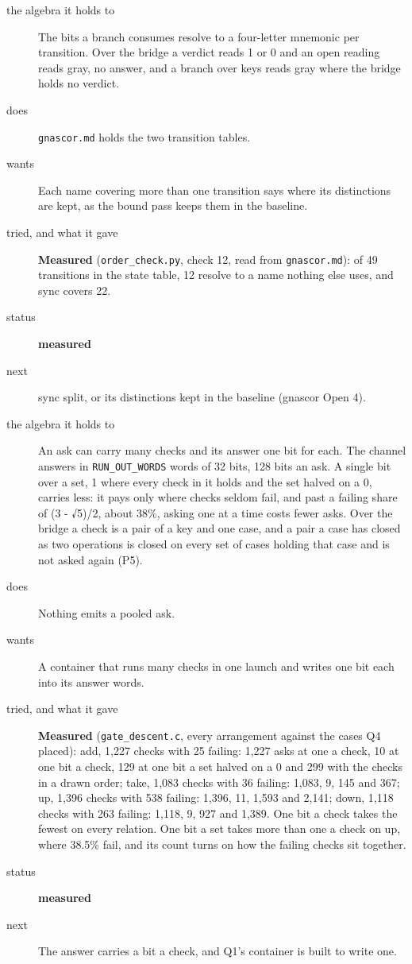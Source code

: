 \begin{description}
\item[{the algebra it holds to}] The bits a branch consumes resolve to a four-letter mnemonic per transition. Over the bridge a verdict reads 1 or 0 and an open reading reads gray, no answer, and a branch over keys reads gray where the bridge holds no verdict.
\item[{does}] \texttt{gnascor.\allowbreak{}md} holds the two transition tables.
\item[{wants}] Each name covering more than one transition says where its distinctions are kept, as the bound pass keeps them in the baseline.
\item[{tried, and what it gave}] \textbf{Measured} (\texttt{order\_\allowbreak{}check.\allowbreak{}py}, check 12, read from \texttt{gnascor.\allowbreak{}md}): of 49 transitions in the state table, 12 resolve to a name nothing else uses, and sync covers 22.
\item[{status}] \textbf{measured}
\item[{next}] sync split, or its distinctions kept in the baseline (gnascor Open 4).
\end{description}

\begin{description}
\item[{the algebra it holds to}] An ask can carry many checks and its answer one bit for each. The channel answers in \texttt{RUN\_\allowbreak{}OUT\_\allowbreak{}WORDS} words of 32 bits, 128 bits an ask. A single bit over a set, 1 where every check in it holds and the set halved on a 0, carries less: it pays only where checks seldom fail, and past a failing share of (3 - √5)/2, about 38\%, asking one at a time costs fewer asks. Over the bridge a check is a pair of a key and one case, and a pair a case has closed as two operations is closed on every set of cases holding that case and is not asked again (P5).
\item[{does}] Nothing emits a pooled ask.
\item[{wants}] A container that runs many checks in one launch and writes one bit each into its answer words.
\item[{tried, and what it gave}] \textbf{Measured} (\texttt{gate\_\allowbreak{}descent.\allowbreak{}c}, every arrangement against the cases Q4 placed): add, 1,227 checks with 25 failing: 1,227 asks at one a check, 10 at one bit a check, 129 at one bit a set halved on a 0 and 299 with the checks in a drawn order; take, 1,083 checks with 36 failing: 1,083, 9, 145 and 367; up, 1,396 checks with 538 failing: 1,396, 11, 1,593 and 2,141; down, 1,118 checks with 263 failing: 1,118, 9, 927 and 1,389. One bit a check takes the fewest on every relation. One bit a set takes more than one a check on up, where 38.5\% fail, and its count turns on how the failing checks sit together.
\item[{status}] \textbf{measured}
\item[{next}] The answer carries a bit a check, and Q1's container is built to write one.
\end{description}

